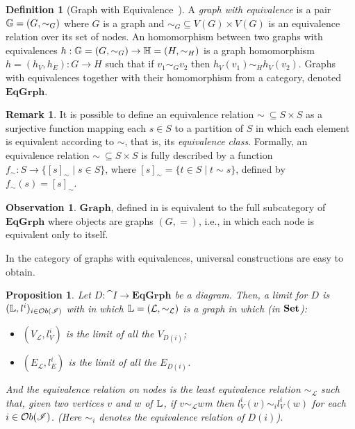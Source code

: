 \documentclass[a4paper, twoside,openright]{report}
\theoremstyle{plain}
\newtheorem{prop}[theorem]{Proposition}
\theoremstyle{definition}
\newtheorem{definition}[theorem]{Definition}
\newtheorem{remark}[theorem]{Remark}
\newtheorem{obs}[theorem]{Observation}
\begin{document}
\begin{definition}[Graph with Equivalence~\cite{concur2006}]
    A \emph{graph with equivalence} is a pair $\mathbb{G} = (G, \sim_G)$ where $G$ is a graph and $\sim_G \subseteq V(G)\times V(G)$ is an equivalence relation over its set of nodes. An homomorphism between two graphs with equivalences $h :\mathbb{G} = (G, \sim_G)\rightarrow \mathbb{H} = (H, \sim_H)$ is a graph homomorphism $h = (h_V, h_E):G \rightarrow H$ such that if $v_1 \sim_G v_2$ then $h_V(v_1) \sim_H h_V(v_2)$. Graphs with equivalences together with their homomorphism from a category, denoted $\mathbf{EqGrph}$.
\end{definition}

\begin{remark}\label{rem:eq_as_surj}
    It is possible to define an equivalence relation $\sim \ \subseteq S\times S$ as a surjective function mapping each $s \in S$ to a partition of $S$ in which each element is equivalent according to $\sim$, that is, its \emph{equivalence class}. Formally, an equivalence relation $\sim \ \subseteq S\times S$ is fully described by a function $f_\sim : S \rightarrow \{[s]_\sim \mid s \in S \}$, where $[s]_\sim = \{t \in S \mid t \sim s\}$, defined by $f_{\sim}(s) = [s]_\sim$. 
\end{remark}

\begin{obs}
    $\mathbf{Graph}$, defined in  is equivalent to the full subcategory of $\mathbf{EqGrph}$ where objects are graphs $(G, =)$, i.e., in which each node is equivalent only to itself.
\end{obs}


In the category of graphs with equivalences, universal constructions are easy to obtain. 
\begin{prop}\label{prop:limits_in_EqGrph}
    Let $D: \cat I \rightarrow \mathbf{EqGrph}$ be a diagram. Then, a limit for $D$ is $(\mathbb{L}, l^i)_{i\in \mathcal{O}b(\mathscr{I})}$ with in which $\mathbb{L} = (\mathcal{L}, \sim_{\mathcal{L}})$ is a graph in which (in $\mathbf{Set}$):
    \begin{itemize}
        \item $(V_{\mathcal{L}}, l^i_{V})$ is the limit of all the $V_{D(i)}$;
        \item $(E_{\mathcal{L}}, l^i_{E})$ is the limit of all the $E_{D(i)}$.
    \end{itemize}
    And the equivalence relation on nodes is the least equivalence relation $\sim_{\mathcal{L}}$ such that, given two vertices $v$ and $w$ of $\mathbb{L}$, if $v\sim_{\mathcal{L}}w$m then $l^i_V(v) \sim_i l^i_V(w)$ for each $i\in \mathcal{O}b(\mathscr{I})$. (Here $\sim_i$ denotes the equivalence relation of $D(i)$).
\end{prop}
\end{document}
